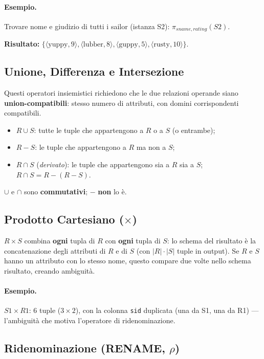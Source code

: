 \documentclass[12pt, a4paper]{article}
\begin{document}
\paragraph{Esempio.} Trovare nome e giudizio di tutti i sailor (istanza S2): $\pi_{sname,rating}(S2)$.

\textbf{Risultato:} $\{\langle\text{yuppy},9\rangle, \langle\text{lubber},8\rangle, \langle\text{guppy},5\rangle, \langle\text{rusty},10\rangle\}$.

\subsection{Unione, Differenza e Intersezione}

Questi operatori insiemistici richiedono che le due relazioni operande siano \textbf{union-compatibili}: stesso numero di attributi, con domini corrispondenti compatibili.
\begin{itemize}
    \item $R \cup S$: tutte le tuple che appartengono a $R$ o a $S$ (o entrambe);
    \item $R - S$: le tuple che appartengono a $R$ ma non a $S$;
    \item $R \cap S$ (\textit{derivato}): le tuple che appartengono sia a $R$ sia a $S$; $R \cap S = R - (R - S)$.
\end{itemize}
$\cup$ e $\cap$ sono \textbf{commutativi}; $-$ \textbf{non} lo è.

\subsection{Prodotto Cartesiano ($\times$)}

$R \times S$ combina \textbf{ogni} tupla di $R$ con \textbf{ogni} tupla di $S$: lo schema del risultato è la concatenazione degli attributi di $R$ e di $S$ (con $|R|\cdot|S|$ tuple in output). Se $R$ e $S$ hanno un attributo con lo stesso nome, questo compare due volte nello schema risultato, creando ambiguità.

\paragraph{Esempio.} $S1 \times R1$: 6 tuple ($3 \times 2$), con la colonna \texttt{sid} duplicata (una da S1, una da R1) — l'ambiguità che motiva l'operatore di ridenominazione.

\subsection{Ridenominazione (RENAME, $\rho$)}
\end{document}
